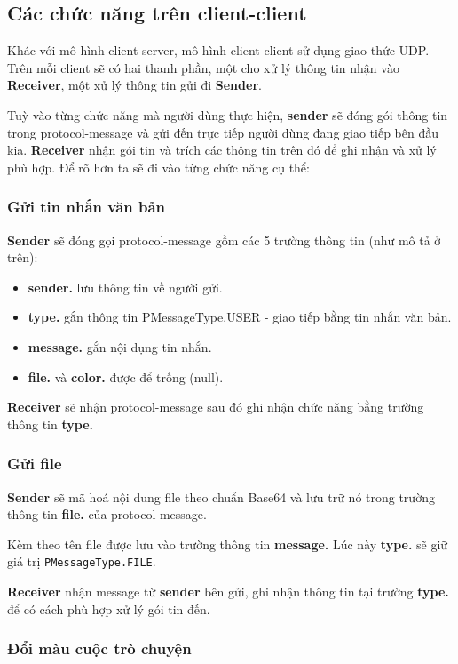 \documentclass[a4paper]{article}
\begin{document}
 
\subsection{Các chức năng trên client-client}

Khác với mô hình client-server, mô hình client-client sử dụng giao thức UDP. Trên mỗi client sẽ có hai thanh phần, một cho xử lý thông tin nhận vào {\bf Receiver}, một xử lý thông tin gửi đi {\bf Sender}.

Tuỳ vào từng chức năng mà người dùng thực hiện, {\bf sender} sẽ đóng gói thông tin trong protocol-message và gửi đến trực tiếp người dùng đang giao tiếp bên đầu kia. {\bf Receiver} nhận gói tin và trích các thông tin trên đó để ghi nhận và xử lý phù hợp. Để rõ hơn ta sẽ đi vào từng chức năng cụ thể:

\subsubsection{Gửi tin nhắn văn bản}
{\bf Sender} sẽ đóng gọi protocol-message gồm các 5 trường thông tin (như mô tả ở trên):
\begin{itemize}
	\item {\bf sender.} lưu thông tin về người gửi.
	\item {\bf type.} gắn thông tin PMessageType.USER - giao tiếp bằng tin nhắn văn bản.
	\item {\bf message.} gắn nội dụng tin nhắn.
	\item {\bf file.} và {\bf color.} được để trống (null).
\end{itemize}

{\bf Receiver} sẽ nhận protocol-message sau đó ghi nhận chức năng bằng trường thông tin {\bf type.}

\subsubsection{Gửi file}

{\bf Sender} sẽ mã hoá nội dung file theo chuẩn Base64 và lưu trữ nó trong trường thông tin {\bf file.} của protocol-message.

Kèm theo tên file được lưu vào trường thông tin {\bf message.} Lúc này {\bf type.} sẽ giữ giá trị {\tt PMessageType.FILE}.

{\bf Receiver} nhận message từ {\bf sender} bên gửi, ghi nhận thông tin tại trường {\bf type.} để có cách phù hợp xử lý gói tin đến.

\subsubsection{Đổi màu cuộc trò chuyện}
\end{document}
